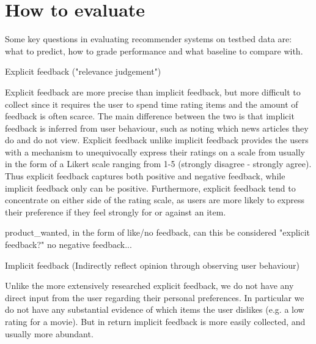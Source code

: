 
\section{How to evaluate}


		
	
		


Some key questions in evaluating recommender systems on testbed data are: what to predict, how to grade performance and what baseline to compare with.


Explicit feedback ("relevance judgement")

Explicit feedback are more precise than implicit feedback, but more difficult
to collect since it requires the user to spend time rating items and the amount
of feedback is often scarce. The main difference between the two is that
implicit feedback is inferred from user behaviour, such as noting which news
articles they do and do not view. Explicit feedback unlike implicit feedback
provides the users with a mechanism to unequivocally express their ratings on a
scale from usually in the form of a Likert scale ranging from 1-5 (strongly
disagree - strongly agree). Thus explicit feedback captures both positive and
negative feedback, while implicit feedback only can be positive. Furthermore,
explicit feedback tend to concentrate on either side of the rating scale, as
users are more likely to express their preference if they feel strongly for or
against an item.

product\_wanted, in the form of like/no feedback, can this be considered
"explicit feedback?" no negative feedback...

Implicit feedback (Indirectly reflect opinion through observing user behaviour)

Unlike the more extensively researched explicit feedback, we do not have any
direct input from the user regarding their personal preferences. In particular
we do not have any substantial evidence of which items the user dislikes (e.g. a
low rating for a movie). But in return implicit feedback is more easily
collected, and usually more abundant.

